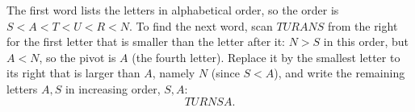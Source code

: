 The first word lists the letters in alphabetical order, so the order is $S<A<T<U<R<N$. To find the next word, scan $TURANS$ from the right for the first letter that is smaller than the letter after it: $N>S$ in this order, but $A<N$, so the pivot is $A$ (the fourth letter). Replace it by the smallest letter to its right that is larger than $A$, namely $N$ (since $S<A$), and write the remaining letters $A,S$ in increasing order, $S,A$:
\[\boxed{TURNSA}.\]
